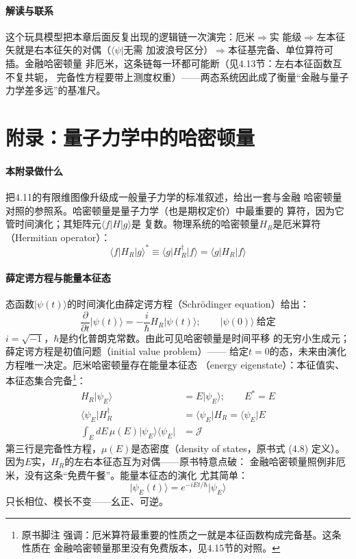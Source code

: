 \paragraph{解读与联系}
这个玩具模型把本章后面反复出现的逻辑链一次演完：厄米$\Rightarrow$实
能级$\Rightarrow$左本征矢就是右本征矢的对偶（$\langle\psi\vert$无需
加波浪号区分）$\Rightarrow$本征基完备、单位算符可插。金融哈密顿量
非厄米，这条链每一环都可能断（见4.13节：左右本征函数互不复共轭，
完备性方程要带上测度权重）——两态系统因此成了衡量“金融与量子
力学差多远”的基准尺。

\section{附录：量子力学中的哈密顿量}

\paragraph{本附录做什么}
把4.11的有限维图像升级成一般量子力学的标准叙述，给出一套与金融
哈密顿量对照的参照系。哈密顿量是量子力学（也是期权定价）中最重要的
算符，因为它管时间演化；其矩阵元$\langle f\vert H\vert g\rangle$是
复数。物理系统的哈密顿量$H_R$是厄米算符（Hermitian operator）：
\begin{equation*}
\langle f\vert H_R\vert g\rangle^{*}\equiv\langle g\vert H_R^{\dagger}
\vert f\rangle=\langle g\vert H_R\vert f\rangle
\end{equation*}

\paragraph{薛定谔方程与能量本征态}
态函数$\vert\psi(t)\rangle$的时间演化由薛定谔方程（Schr\"odinger
equation）给出：
\begin{equation*}
\frac{\partial}{\partial t}\vert\psi(t)\rangle=-\frac{i}{\hbar}
H_R\vert\psi(t)\rangle;\qquad \vert\psi(0)\rangle\ \text{给定}
\end{equation*}
$i=\sqrt{-1}$，$\hbar$是约化普朗克常数。由此可见哈密顿量是时间平移
的无穷小生成元；薛定谔方程是初值问题（initial value problem）——
给定$t=0$的态，未来由演化方程唯一决定。厄米哈密顿量存在能量本征态
（energy eigenstate）：本征值实、本征态集合完备\footnote{原书脚注
强调：厄米算符最重要的性质之一就是本征函数构成完备基。这条性质在
金融哈密顿量那里没有免费版本，见4.15节的对照。}：
\begin{align*}
H_R\vert\psi_E\rangle&=E\vert\psi_E\rangle;\qquad E^{*}=E\\
\langle\psi_E\vert H_R^{\dagger}&=\langle\psi_E\vert H_R
=\langle\psi_E\vert E\\
\int_E dE\,\mu(E)\vert\psi_E\rangle\langle\psi_E\vert&=\mathcal{J}
\tag{4.59}
\end{align*}
第三行是完备性方程，$\mu(E)$是态密度（density of states，原书式
(4.8) 定义）。因为$E$实，$H_R$的左右本征态互为对偶——原书特意点破：
金融哈密顿量照例非厄米，没有这条“免费午餐”。能量本征态的演化
尤其简单：
\begin{equation*}
\vert\psi_E(t)\rangle=e^{-iEt/\hbar}\vert\psi_E\rangle
\end{equation*}
只长相位、模长不变——幺正、可逆。

